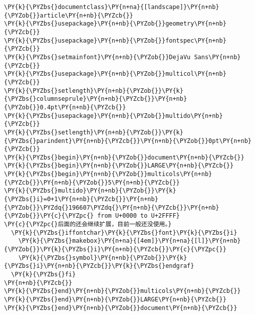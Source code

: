 \begin{Verbatim}[commandchars=\\\{\}]
\PY{k}{\PYZbs{}documentclass}\PY{n+na}{[landscape]}\PY{n+nb}{\PYZob{}}article\PY{n+nb}{\PYZcb{}}
\PY{k}{\PYZbs{}usepackage}\PY{n+nb}{\PYZob{}}geometry\PY{n+nb}{\PYZcb{}}
\PY{k}{\PYZbs{}usepackage}\PY{n+nb}{\PYZob{}}fontspec\PY{n+nb}{\PYZcb{}}
\PY{k}{\PYZbs{}setmainfont}\PY{n+nb}{\PYZob{}}DejaVu Sans\PY{n+nb}{\PYZcb{}}
\PY{k}{\PYZbs{}usepackage}\PY{n+nb}{\PYZob{}}multicol\PY{n+nb}{\PYZcb{}}
\PY{k}{\PYZbs{}setlength}\PY{n+nb}{\PYZob{}}\PY{k}{\PYZbs{}columnseprule}\PY{n+nb}{\PYZcb{}}\PY{n+nb}{\PYZob{}}0.4pt\PY{n+nb}{\PYZcb{}}
\PY{k}{\PYZbs{}usepackage}\PY{n+nb}{\PYZob{}}multido\PY{n+nb}{\PYZcb{}}
\PY{k}{\PYZbs{}setlength}\PY{n+nb}{\PYZob{}}\PY{k}{\PYZbs{}parindent}\PY{n+nb}{\PYZcb{}}\PY{n+nb}{\PYZob{}}0pt\PY{n+nb}{\PYZcb{}}
\PY{k}{\PYZbs{}begin}\PY{n+nb}{\PYZob{}}document\PY{n+nb}{\PYZcb{}}
\PY{k}{\PYZbs{}begin}\PY{n+nb}{\PYZob{}}LARGE\PY{n+nb}{\PYZcb{}}
\PY{k}{\PYZbs{}begin}\PY{n+nb}{\PYZob{}}multicols\PY{n+nb}{\PYZcb{}}\PY{n+nb}{\PYZob{}}5\PY{n+nb}{\PYZcb{}}
\PY{k}{\PYZbs{}multido}\PY{n+nb}{\PYZob{}}\PY{k}{\PYZbs{}i}=0+1\PY{n+nb}{\PYZcb{}}\PY{n+nb}{\PYZob{}}\PYZdq{}196607\PYZdq{}\PY{n+nb}{\PYZcb{}}\PY{n+nb}{\PYZob{}}\PY{c}{\PYZpc{} from U+0000 to U+2FFFF}
\PY{c}{\PYZpc{}后面的还会继续扩展，目前一般还没使用。}
  \PY{k}{\PYZbs{}iffontchar}\PY{k}{\PYZbs{}font}\PY{k}{\PYZbs{}i}
    \PY{k}{\PYZbs{}makebox}\PY{n+na}{[4em]}\PY{n+na}{[l]}\PY{n+nb}{\PYZob{}}\PY{k}{\PYZbs{}i}\PY{n+nb}{\PYZcb{}}\PY{c}{\PYZpc{}}
    \PY{k}{\PYZbs{}symbol}\PY{n+nb}{\PYZob{}}\PY{k}{\PYZbs{}i}\PY{n+nb}{\PYZcb{}}\PY{k}{\PYZbs{}endgraf}
  \PY{k}{\PYZbs{}fi}
\PY{n+nb}{\PYZcb{}}
\PY{k}{\PYZbs{}end}\PY{n+nb}{\PYZob{}}multicols\PY{n+nb}{\PYZcb{}}
\PY{k}{\PYZbs{}end}\PY{n+nb}{\PYZob{}}LARGE\PY{n+nb}{\PYZcb{}}
\PY{k}{\PYZbs{}end}\PY{n+nb}{\PYZob{}}document\PY{n+nb}{\PYZcb{}}
\end{Verbatim}
